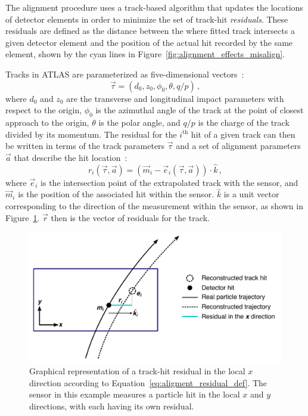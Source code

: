 The alignment procedure uses a track-based algorithm that updates the locations of detector elements in order to minimize the set of track-hit \emph{residuals}.
These residuals are defined as the distance between the where fitted track intersects a given detector element and the position of the actual hit recorded by the same element, shown by the cyan lines in Figure~\ref{fig:alignment_effects_misalign}.

Tracks in ATLAS are parameterized as five-dimensional vectors~\cite{2006.atlas-tracking-model}:%
\begin{equation}
  \vec{\tau} = (d_0,z_0,\phi_0,\theta,q/p)\,,
\end{equation}
where $d_0$ and $z_0$ are the transverse and longitudinal impact parameters with respect to the origin, $\phi_0$ is the azimuthal angle of the track at the point of closest approach to the origin, $\theta$ is the polar angle, and $q/p$ is the charge of the track divided by its momentum.
The residual for the $i^{\textrm{th}}$ hit of a given track can then be written in terms of the track parameters $\vec{\tau}$ and a set of alignment parameters $\vec{a}$ that describe the hit location~\cite{2005.global-chi2-alignment}:
\begin{equation}
  r_i(\vec{\tau},\vec{a}) = (\vec{m}_i - \vec{e}_i (\vec{\tau},\vec{a}))\cdot\hat{k}\,,
  \label{eq:aligment_residual_def}
\end{equation}
where $\vec{e}_i$ is the intersection point of the extrapolated track with the sensor, and $\vec{m}_i$ is the position of the associated hit within the sensor.
$\hat{k}$ is a unit vector corresponding to the direction of the measurement within the sensor, as shown in Figure~\ref{fig:alignment_residual}.
$\vec{r}$ then is the vector of residuals for the track.

\begin{figure}[htbp]
  \centering
  \includegraphics[width=.74\textwidth]{figs/alignment/residual2}
  \caption{Graphical representation of a track-hit residual in the local $x$ direction according to Equation~\ref{eq:aligment_residual_def}.  The sensor in this example measures a particle hit in the local $x$ and $y$ directions, with each having its own residual.}
  \label{fig:alignment_residual}
\end{figure}

